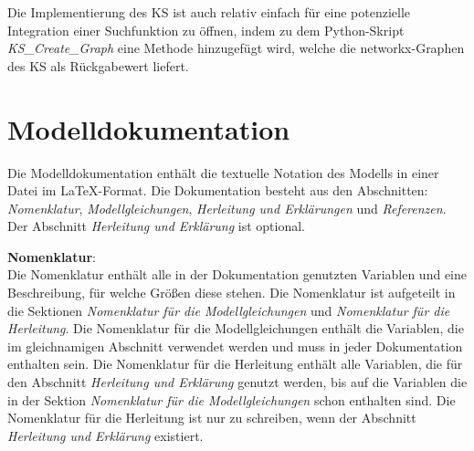 Die Implementierung des KS ist auch relativ einfach für eine potenzielle Integration einer Suchfunktion zu öffnen, indem zu dem Python-Skript \textit{KS\_Create\_Graph} eine Methode hinzugefügt wird, welche die networkx-Graphen des KS als Rückgabewert liefert.  

\section{Modelldokumentation}
\label{Ch:Ergebnisse:Sec:Dokumentation}
Die Modelldokumentation enthält die textuelle Notation des Modells in einer Datei im \LaTeX-Format. Die Dokumentation besteht aus den Abschnitten: \textit{Nomenklatur}, \textit{Modellgleichungen}, \textit{Herleitung und Erklärungen} und \textit{Referenzen}. Der Abschnitt \textit{Herleitung und Erklärung} ist optional.

\textbf{Nomenklatur}:\\
Die Nomenklatur enthält alle in der Dokumentation genutzten Variablen und eine Beschreibung, für welche Größen diese stehen. Die Nomenklatur ist aufgeteilt in die Sektionen \textit{Nomenklatur für die Modellgleichungen} und \textit{Nomenklatur für die Herleitung}. Die Nomenklatur für die Modellgleichungen enthält die Variablen, die im gleichnamigen Abschnitt verwendet werden und muss in jeder Dokumentation enthalten sein. Die Nomenklatur für die Herleitung enthält alle Variablen, die für den Abschnitt \textit{Herleitung und Erklärung} genutzt werden, bis auf die Variablen die in der Sektion \textit{Nomenklatur für die Modellgleichungen} schon enthalten sind. Die Nomenklatur für die Herleitung ist nur zu schreiben, wenn der Abschnitt \textit{Herleitung und Erklärung} existiert.

